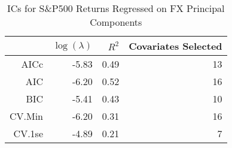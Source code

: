 \begin{table}[ht]
\centering
\begin{tabular}{rrrr}
  \hline
 & $\log(\lambda)$ & $R^2$ & Covariates Selected \\ 
  \hline
AICc & -5.83 & 0.49 &  13 \\ 
  AIC & -6.20 & 0.52 &  16 \\ 
  BIC & -5.41 & 0.43 &  10 \\ 
  CV.Min & -6.20 & 0.31 &  16 \\ 
  CV.1se & -4.89 & 0.21 &   7 \\ 
   \hline
\end{tabular}
\caption{ICs for S\&P500 Returns Regressed on FX Principal Components} 
\label{tab:spreg_ics}
\end{table}
